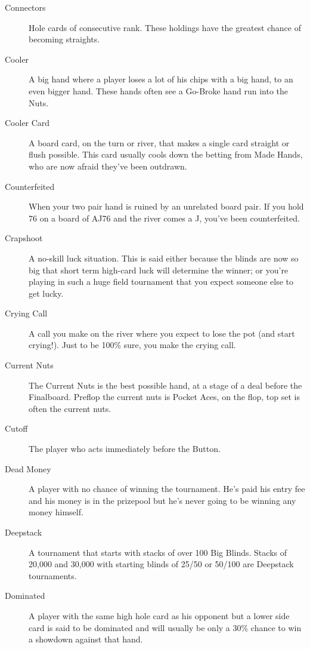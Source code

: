 \begin{description}
\item[Connectors] Hole cards of consecutive rank. These holdings have
the greatest chance of becoming straights.

\item[Cooler] A big hand where a player loses a lot of his chips with
a big hand, to an even bigger hand. These hands often see a Go-Broke
hand run into the Nuts.

\item[Cooler Card] A board card, on the turn or river, that makes a
single card straight or flush possible. This card usually cools down
the betting from Made Hands, who are now afraid they've been outdrawn.

\item[Counterfeited] When your two pair hand is ruined by an unrelated
board pair. If you hold 76 on a board of AJ76 and the river comes a J,
you've been counterfeited.

\item[Crapshoot] A no-skill luck situation. This is said either
because the blinds are now so big that short term high-card luck will
determine the winner; or you're playing in such a huge field
tournament that you expect someone else to get lucky.

\item[Crying Call] A call you make on the river where you expect to
lose the pot (and start crying!). Just to be 100\% sure, you make the
crying call.

\item[Current Nuts] The Current Nuts is the best possible hand, at a
stage of a deal before the Finalboard. Preflop the current nuts is
Pocket Aces, on the flop, top set is often the current nuts.

\item[Cutoff] The player who acts immediately before the Button.

\item[Dead Money] A player with no chance of winning the tournament.
He's paid his entry fee and his money is in the prizepool but he's
never going to be winning any money himself.

\item[Deepstack] A tournament that starts with stacks of over 100 Big
Blinds. Stacks of 20,000 and 30,000 with starting blinds of 25/50 or
50/100 are Deepstack tournaments.

\item[Dominated] A player with the same high hole card as his opponent
but a lower side card is said to be dominated and will usually be
only a 30\% chance to win a showdown against that hand.


\end{description}
